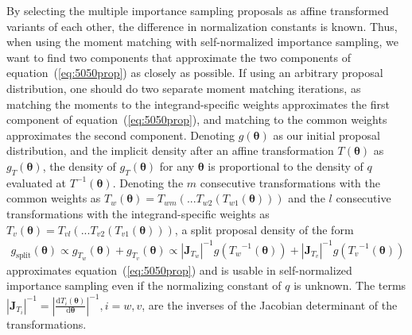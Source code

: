 \documentclass[12pt]{article}
\newcommand{\ome}{v}
\newenvironment{nalign}{
    \begin{equation}
    \begin{aligned}
}{
    \end{aligned}
    \end{equation}
    \ignorespacesafterend
}
\begin{document}
By selecting the multiple importance sampling proposals as affine transformed variants
of each other, the difference in normalization constants is known.
Thus, when using the moment matching with self-normalized importance sampling,
we want to find two components that approximate the two components of equation~(\ref{eq:5050prop})
as closely as possible.
If using an arbitrary proposal distribution, one should do two separate moment matching iterations, as
matching the moments to the integrand-specific weights approximates the first component of equation~(\ref{eq:5050prop}), and matching to the common weights approximates the second component.
Denoting $g(\boldsymbol{\theta})$ as our initial proposal distribution, and the implicit
density after an affine transformation $T (\boldsymbol{\theta})$
as $g_T (\boldsymbol{\theta})$, the density of $g_T (\boldsymbol{\theta})$
for any $\boldsymbol{\theta}$ is proportional to the density of $q$ evaluated at $T^{-1} (\boldsymbol{\theta})$.
Denoting the $m$ consecutive transformations with the common weights as $T_w (\boldsymbol{\theta}) = T_{wm} ( ... T_{w2} ( T_{w1} (\boldsymbol{\theta})))$ and the $l$ consecutive transformations with the integrand-specific weights as
$T_{\ome} (\boldsymbol{\theta}) = T_{\ome l} ( ... T_{\ome 2} ( T_{\ome 1} (\boldsymbol{\theta})))$,
a
split proposal density of the form
\begin{nalign} \label{eq:splitprop-gen}
g_{\text{split}} (\boldsymbol{\theta}) \propto    g_{T_w} (\boldsymbol{\theta}) + g_{T_{\ome}} (\boldsymbol{\theta}) \propto    |\mathbf{J}_{T_w}|^{-1}  g ({T_w}^{-1} (\boldsymbol{\theta})) +   |\mathbf{J}_{T_{\ome}}|^{-1}  g ({T_{\ome}}^{-1} (\boldsymbol{\theta}))
\end{nalign}
approximates equation~(\ref{eq:5050prop}) and is usable in self-normalized importance sampling
even if the normalizing constant of $q$ is unknown. The terms
$|\mathbf{J}_{T_i}|^{-1} = \left | \frac{\mathrm{d} {T_i} (\boldsymbol{\theta})}{\mathrm{d} \boldsymbol{\theta}} \right |^{-1}, i = w, \ome $, are the inverses of the Jacobian determinant of the transformations.
\end{document}
